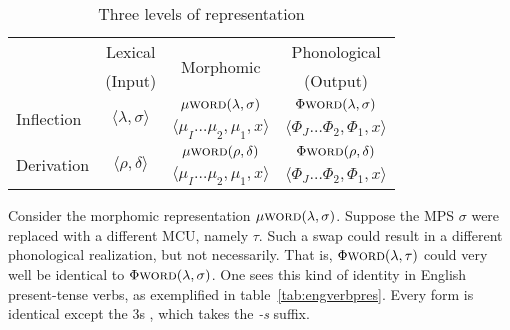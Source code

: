 \begin{table}[ht]
\centering
\begin{tabular}{l c c c}
\hline\hline
    & Lexical & \multirow{2}{*}{Morphomic}  & Phonological  \\
    & (Input)	 &        	&  (Output) \\
\hline
\multirow{2}{*}{Inflection} & \multirow{2}{*}{$\langle \lambda,\sigma \rangle$} & $\mu{\textsc{word}}(\lambda,\sigma)$ & $\Phi{\textsc{word}}(\lambda,\sigma)$\\     
    				&  &  $\langle  \mu_{I} \dots \mu_{2}, \mu_{1}, x \rangle$ & 
				$\langle  \Phi_{J} \dots \Phi_{2}, \Phi_{1}, x \rangle$ \\ \hline 
\multirow{2}{*}{Derivation} & \multirow{2}{*}{$\langle \rho,\delta \rangle$} & 
$\mu{\textsc{word}}(\rho,\delta)$ & 
$\Phi{\textsc{word}}(\rho,\delta)$ \\
    				& & $\langle \mu_{I} \dots \mu_{2}, \mu_{1}, x \rangle$ & $\langle \Phi_{J} \dots \Phi_{2}, \Phi_{1}, x \rangle$ \\[0.5ex]
\hline 
\end{tabular}
\label{tab:morphreps}
\caption{Three levels of representation}
\end{table}
Consider the morphomic representation $\mu{\textsc{word}}(\lambda,\sigma)$.
Suppose the \ac{MPS} $\sigma$ were replaced with a different \ac{MCU}, namely $\tau$. 
Such a swap could result in a different phonological realization, but not necessarily. 
That is, $\Phi{\textsc{word}}(\lambda,\tau)$ could very well be identical to 
 $\Phi{\textsc{word}}(\lambda,\sigma)$. One sees this kind of identity in English
 present-tense verbs, as exemplified in table~\ref{tab:engverbpres}. Every form is identical except the 3s , which takes the \textit{-s} suffix.%

